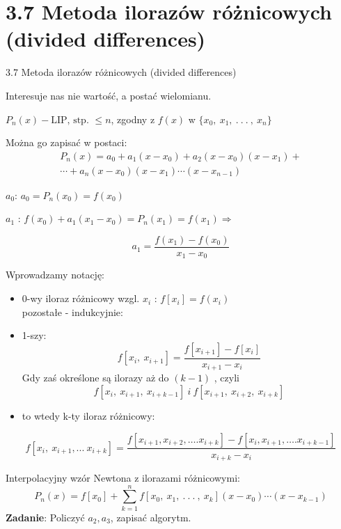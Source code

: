\section{3.7 Metoda ilorazów różnicowych (divided differences)}
\begin{frame}
{3.7 Metoda ilorazów różnicowych (divided differences)}

Interesuje nas nie wartość, a postać wielomianu.

$P_{n}(x)-\text{LIP, stp. } \leq n$, zgodny z $f(x)$ w $\{x_{0},\ x_{1},\ .\ .\ .\ ,\ x_{n}\}$

Można go zapisać w postaci:
\begin{equation*}\begin{split}
P_{n}(x)=a_{0}+a_{1}(x-x_{0})+a_{2}(x-x_{0})(x-x_{1})+ \\
\cdots+a_{n}(x-x_{0})(x-x_{1})\cdots(x-x_{n-1})
\end{split}
\end{equation*}

$a_{0}$: $a_{0}=P_{n}(x_{0})=f(x_{0})$

$a_{1}$ : $f(x_{0})+a_{1}(x_{1}-x_{0})=P_{n}(x_{1})=f(x_{1}) \Rightarrow$

$$
a_{1}=\frac{f(x_{1})-f(x_{0})}{x_{1}-x_{0}}
$$
\end{frame}

\begin{frame}
Wprowadzamy notację:
\begin{itemize}
\item 0-wy iloraz różnicowy wzgl. $x_{i}$ : $f[x_{i}]=f(x_{i})$ \\
pozostałe - indukcyjnie:

\item 1-szy:
$$
f[x_{i},\ x_{i+1}]=\frac{f[x_{i+1}]-f[x_{i}]}{x_{i+1}-x_{i}}
$$
Gdy zaś określone są ilorazy aż do $(k-1)$ , czyli
$$
f[x_{i},\ x_{i+1},\ x_{i+k-1}] \: i \: f[x_{i+1},\ x_{i+2},\ x_{i+k}]
$$
\item to wtedy k-ty iloraz różnicowy:
\end{itemize}
$$
f[x_{i},\ x_{i+1}, ...\ x_{i+k}]=\frac{f[x_{i+1},x_{i+2},\ldots.x_{i+k}]-f[x_{i},x_{i+1},\ldots.x_{i+k-1}]}{x_{i+k}-x_{i}}
$$
\end{frame}

\begin{frame}
Interpolacyjny wzór Newtona z ilorazami różnicowymi:
$$
P_{n}(x)=f[x_{0}]+\sum_{k=1}^{n}f[x_{0},\ x_{1},\ .\ .\ .\ ,\ x_{k}](x-x_{0})\cdots(x-x_{k-1})
$$
\textbf{Zadanie}: Policzyć $a_{2}, a_{3}$, zapisać algorytm.

\end{frame}

